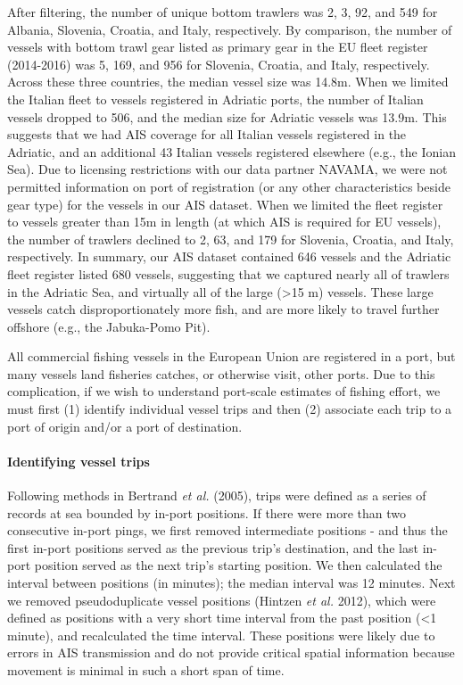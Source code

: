 \documentclass[11pt,]{article}
\let\oldparagraph\paragraph
\renewcommand{\paragraph}[1]{\oldparagraph{#1}\mbox{}}
\begin{document}
After filtering, the number of unique bottom trawlers was 2, 3, 92, and
549 for Albania, Slovenia, Croatia, and Italy, respectively. By
comparison, the number of vessels with bottom trawl gear listed as
primary gear in the EU fleet register (2014-2016) was 5, 169, and 956
for Slovenia, Croatia, and Italy, respectively. Across these three
countries, the median vessel size was 14.8m. When we limited the Italian
fleet to vessels registered in Adriatic ports, the number of Italian
vessels dropped to 506, and the median size for Adriatic vessels was
13.9m. This suggests that we had AIS coverage for all Italian vessels
registered in the Adriatic, and an additional 43 Italian vessels
registered elsewhere (e.g., the Ionian Sea). Due to licensing
restrictions with our data partner NAVAMA, we were not permitted
information on port of registration (or any other characteristics beside
gear type) for the vessels in our AIS dataset. When we limited the fleet
register to vessels greater than 15m in length (at which AIS is required
for EU vessels), the number of trawlers declined to 2, 63, and 179 for
Slovenia, Croatia, and Italy, respectively. In summary, our AIS dataset
contained 646 vessels and the Adriatic fleet register listed 680
vessels, suggesting that we captured nearly all of trawlers in the
Adriatic Sea, and virtually all of the large (\textgreater{}15 m)
vessels. These large vessels catch disproportionately more fish, and are
more likely to travel further offshore (e.g., the Jabuka-Pomo Pit).

All commercial fishing vessels in the European Union are registered in a
port, but many vessels land fisheries catches, or otherwise visit, other
ports. Due to this complication, if we wish to understand port-scale
estimates of fishing effort, we must first (1) identify individual
vessel trips and then (2) associate each trip to a port of origin and/or
a port of destination.

\paragraph{Identifying vessel trips}\label{identifying-vessel-trips}

Following methods in Bertrand \emph{et al.} (2005), trips were defined
as a series of records at sea bounded by in-port positions. If there
were more than two consecutive in-port pings, we first removed
intermediate positions - and thus the first in-port positions served as
the previous trip's destination, and the last in-port position served as
the next trip's starting position. We then calculated the interval
between positions (in minutes); the median interval was 12 minutes. Next
we removed pseudoduplicate vessel positions (Hintzen \emph{et al.}
2012), which were defined as positions with a very short time interval
from the past position (\textless{}1 minute), and recalculated the time
interval. These positions were likely due to errors in AIS transmission
and do not provide critical spatial information because movement is
minimal in such a short span of time.
\end{document}
